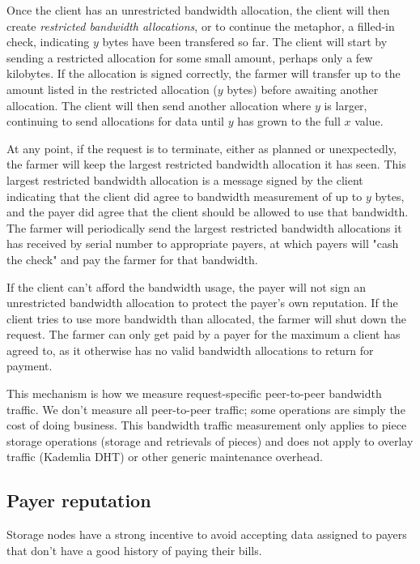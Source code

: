 \documentclass[a4paper,10pt]{article} \usepackage[utf8]{inputenc}
\begin{document}
Once the client has an unrestricted bandwidth allocation, the client will then
create {\em restricted bandwidth allocations}, or to continue the metaphor, a
filled-in check, indicating $y$ bytes have been transfered so far. The client
will start by sending a restricted allocation for some small amount, perhaps
only a few kilobytes. If the allocation is signed correctly, the farmer will
transfer up to the amount listed in the restricted allocation ($y$ bytes) before
awaiting another allocation. The client will then send another allocation where
$y$ is larger, continuing to send allocations for data until $y$ has grown to
the full $x$ value.

At any point, if the request is to terminate, either as planned or unexpectedly,
the farmer will keep the largest restricted bandwidth allocation it has seen.
This largest restricted bandwidth allocation is a message signed by the client
indicating that the client did agree to bandwidth measurement of up to $y$
bytes, and the payer did agree that the client should be allowed to use that
bandwidth. The farmer will periodically send the largest restricted bandwidth
allocations it has received by serial number to appropriate payers, at which
payers will "cash the check" and pay the farmer for that bandwidth.

If the client can't afford the bandwidth usage, the payer will not sign an
unrestricted bandwidth allocation to protect the payer's own reputation. If
the client tries to use more bandwidth than allocated, the farmer will shut down
the request. The farmer can only get paid by a payer for the maximum a client
has agreed to, as it otherwise has no valid bandwidth allocations to return for
payment.

This mechanism is how we measure request-specific peer-to-peer bandwidth
traffic. We don't measure all peer-to-peer traffic; some operations are simply
the cost of doing business. This bandwidth traffic measurement only applies
to piece storage operations (storage and retrievals of pieces) and does not
apply to overlay traffic (Kademlia DHT) or other generic maintenance overhead.

\subsection{Payer reputation}

Storage nodes have a strong incentive to avoid accepting data assigned to payers
that don't have a good history of paying their bills.
\end{document}
